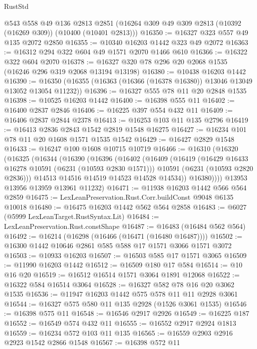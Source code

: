 \begin{lexlean}{RustStd}
\begin{coremodule}
{{    @543
    @558
    @49
    @136
    @2813
    @2851
    (@16264 @309 @49 @309 @2813 (@10392 (@16269 @309)) (@10400 (@10401 @2813)))
@16350 := @16327 @323 @557 @49 @135 @2072 @2850
@16355 := @10340 @16203 @1442 @323 @49 @2072
@16363 := @16312 @294 @322 @604 @49 @1571 @2070 @1466 @610
@16366 := @16322 @322 @604 @2070
@16378 := @16327 @320 @78 @296 @20 @2068 @1535 (@16246 @296 @319 @2068 @13194 @13198)
@16380 := @10438 @16203 @1442
@16390 := @16350 (@16355 (@16363 (@16366 (@16378 @16380)) @13046 @13049 @13052 @13054 @11232))
@16396 := @16327 @555 @78 @11 @20 @2848 @1535
@16398 := @10525 @16203 @1442
@16400 := @16398 @555 @11
@16402 := @16400 @2837 @2846
@16406 := @16225 @397 @554 @432 @11
@16409 := @16406 @2837 @2844 @2378
@16413 := @16253 @103 @11 @135 @2796
@16419 := @16413 @2836 @2843 @1542 @2819 @1548 @16275
@16427 := @16234 @101 @78 @11 @20 @1608 @1571 @1535 @1542
@16429 := @16427 @2829 @1548
@16433 := @16247 @100 @1608 @10715 @10719
@16466 := @16310
    (@16320
      (@16325
        (@16344
          (@16390
            (@16396
              (@16402
                (@16409
                  (@16419
                    (@16429 @16433 @16278 @10591 (@6231 (@10593 @2830 @1571)))
                    @10591
                    (@6231 (@10593 @2820 @2836)))
                  @14513
                  @14516
                  @14519
                  @14523
                  @14528
                  @14534))
              @16380))))
      @13953
      @13956
      @13959
      @13961
      @11232)
@16471 := @11938 @16203 @1442 @566 @564 @2859
@16475 := LexLeanPreservation.Rust.Corr.buildConst @9048 @6135 @10018
@16480 := @16475 @16203 @1442 @562 @564 @2858
@16483 := @6027 (@5999 LexLeanTarget.RustSyntax.Lit)
@16484 := LexLeanPreservation.Rust.constShape
@16487 := @16483 (@16484 @562 @564)
@16492 := @16214 (@16298 (@16466 (@16471 (@16480 @16487))))
@16502 := @16300 @1442 @10646 @2861 @585 @588 @17 @1571 @3066 @1571 @3072
@16503 := @10933 @16203
@16507 := @16503 @585 @17 @1571 @3065
@16509 := @11990 @16203 @1442
@16512 := @16509 @180 @17 @584
@16514 := @10 @16 @20
@16519 := @16512 @16514 @1571 @3064 @1891 @12068
@16522 := @16322 @584 @16514 @3064
@16528 := @16327 @582 @78 @16 @20 @3062 @1535
@16536 := @11947 @16203 @1442 @575 @578 @11 @11 @2928 @3061
@16544 := @16327 @575 @580 @11 @135 @2928 (@1526 @3061 @1535)
@16546 := @16398 @575 @11
@16548 := @16546 @2917 @2926
@16549 := @16225 @187
@16552 := @16549 @574 @432 @11
@16555 := @16552 @2917 @2924 @1813
@16559 := @16234 @572 @103 @11 @135
@16565 := @16559 @2903 @2916 @2923 @1542 @2866 @1548
@16567 := @16398 @572 @11
}}
\end{coremodule}
\end{lexlean}
